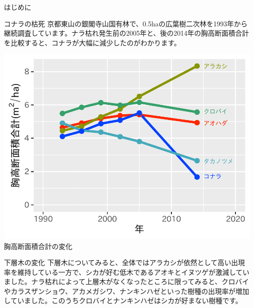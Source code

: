 \documentclass[unicode]{beamer}
\begin{document}
\begin{frame}
\begin{columns}[t]
\begin{column}{.49\linewidth}
\begin{block}{はじめに}
\end{block}

\begin{block}{コナラの枯死}
京都東山の銀閣寺山国有林で、0.5haの広葉樹二次林を1993年から継続調査しています。ナラ枯れ発生前の2005年と、後の2014年の胸高断面積合計を比較すると、コナラが大幅に減少したのがわかります。
\vspace{2cm}

\centering
\includegraphics{basal_area.pdf} \\
{\small 胸高断面積合計の変化}
\end{block}


\begin{block}{下層木の変化}
下層木についてみると、全体ではアラカシが依然として高い出現率を維持している一方で、シカが好む低木であるアオキとイヌツゲが激減していました。ナラ枯れによって上層木がなくなったところに限ってみると、クロバイやカラスザンショウ、アカメガシワ、ナンキンハゼといった樹種の出現率が増加していました。このうちクロバイとナンキンハゼはシカが好まない樹種です。

\vspace{2cm}


\end{block}
\end{column}
\end{columns}
\end{frame}
\end{document}
